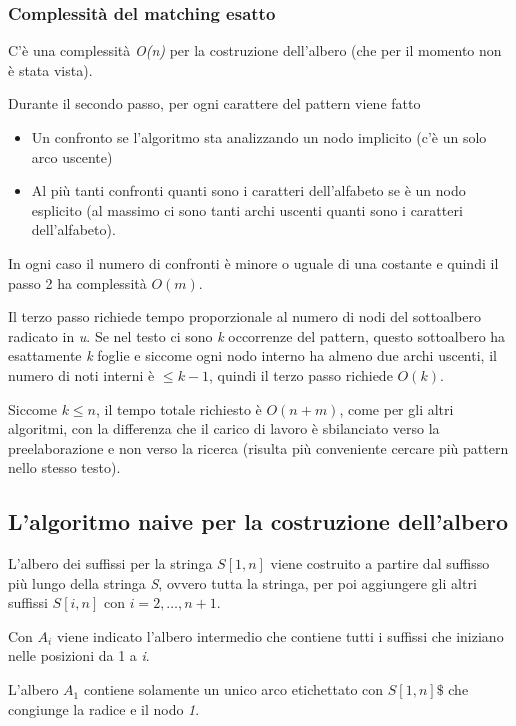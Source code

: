 \subsubsection{Complessità del matching esatto}\label{complessituxe0-del-matching-esatto}

C'è una complessità \emph{O(n)} per la costruzione dell'albero (che per il momento non è stata vista).

Durante il secondo passo, per ogni carattere del pattern viene fatto
\begin{itemize}
	\item Un confronto se l'algoritmo sta analizzando un nodo implicito (c'è un solo arco uscente)
	\item Al più tanti confronti quanti sono i caratteri dell'alfabeto se è un nodo esplicito (al massimo ci sono tanti archi uscenti quanti sono i caratteri dell'alfabeto).
\end{itemize}

In ogni caso il numero di confronti è minore o uguale di una costante e quindi il passo 2 ha complessità $ O(m) $.

Il terzo passo richiede tempo proporzionale al numero di nodi del sottoalbero radicato in \textit{u}.
Se nel testo ci sono \textit{k} occorrenze del pattern, questo sottoalbero ha esattamente \textit{k} foglie e siccome ogni nodo interno ha almeno due archi uscenti, il numero di noti interni è $ \leq k-1 $, quindi il terzo passo richiede $ O(k) $.

Siccome $ k \leq n $, il tempo totale richiesto è $ O(n+m) $, come per gli altri algoritmi, con la differenza che il carico di lavoro è sbilanciato verso la preelaborazione e non verso la ricerca (risulta più conveniente cercare più pattern nello stesso testo).

\subsection{L'algoritmo naive per la costruzione dell'albero} \label{lalgoritmo-naive-per-la-costruzione-dellalbero}

L'albero dei suffissi per la stringa $S[1,n]$ viene costruito a partire dal suffisso più lungo della stringa \textit{S}, ovvero tutta la stringa, per poi aggiungere gli altri suffissi $S[i,n]$ con $i = 2, \ldots, n+1$. 

Con $A_i$ viene indicato l'albero intermedio che contiene tutti i suffissi che iniziano nelle posizioni da 1 a \emph{i}.

L'albero $A_1$ contiene solamente un unico arco etichettato con $S[1,n]\$$ che congiunge la radice e il nodo \emph{1}.

